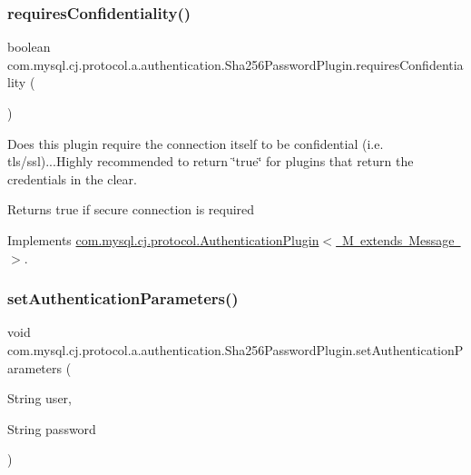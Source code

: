 \subsubsection{\texorpdfstring{requires\+Confidentiality()}{requiresConfidentiality()}}
{\footnotesize\ttfamily boolean com.\+mysql.\+cj.\+protocol.\+a.\+authentication.\+Sha256\+Password\+Plugin.\+requires\+Confidentiality (\begin{DoxyParamCaption}{ }\end{DoxyParamCaption})}

Does this plugin require the connection itself to be confidential (i.\+e. tls/ssl)...Highly recommended to return \char`\"{}true\char`\"{} for plugins that return the credentials in the clear.

\begin{DoxyReturn}{Returns}
true if secure connection is required 
\end{DoxyReturn}


Implements \mbox{\hyperlink{interfacecom_1_1mysql_1_1cj_1_1protocol_1_1_authentication_plugin_a7dfc5f9b4c1e27d33982f8843254ee18}{com.\+mysql.\+cj.\+protocol.\+Authentication\+Plugin$<$ M extends Message $>$}}.

\mbox{\label{classcom_1_1mysql_1_1cj_1_1protocol_1_1a_1_1authentication_1_1_sha256_password_plugin_a3094a9ba3e8a9543ec5e4d89bbb23d47}} 
\subsubsection{\texorpdfstring{set\+Authentication\+Parameters()}{setAuthenticationParameters()}}
{\footnotesize\ttfamily void com.\+mysql.\+cj.\+protocol.\+a.\+authentication.\+Sha256\+Password\+Plugin.\+set\+Authentication\+Parameters (\begin{DoxyParamCaption}\item[{String}]{user,  }\item[{String}]{password }\end{DoxyParamCaption})}

